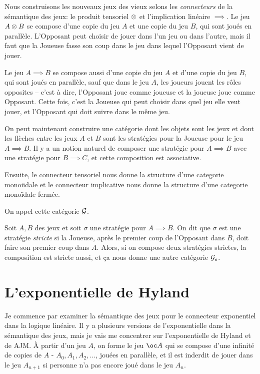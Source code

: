 \documentclass[11pt]{article}
\begin{document}
Nous construisons les nouveaux jeux des vieux selons les \emph{connecteurs} de la s\'{e}mantique des jeux: le produit tensoriel $\otimes$ et l'implication lin\'{e}aire $\implies$.  Le jeu $A\otimes B$ se compose d'une copie du jeu $A$ et une copie du jeu $B$, qui sont jou\'{e}s en parall\`{e}le.  L'Opposant peut choisir de jouer dans l'un jeu ou dans l'autre, mais il faut que la Joueuse fasse son coup dans le jeu dans lequel l'Opposant vient de jouer.  

Le jeu $A\implies B$ se compose aussi d'une copie du jeu $A$ et d'une copie du jeu $B$, qui sont jou\'{e}s en parall\`{e}le, sauf que dans le jeu $A$, les joueurs jouent les r\^{o}les opposites -- c'est \`{a} dire, l'Opposant joue comme joueuse et la joueuse joue comme Opposant.  Cette fois, c'est la Joueuse qui peut choisir dans quel jeu elle veut jouer, et l'Opposant qui doit suivre dans le m\^{e}me jeu.  

On peut maintenant construire une cat\'{e}gorie dont les objets sont les jeux et dont les fl\`{e}ches entre les jeux $A$ et $B$ sont les strat\'{e}gies pour la Joueuse pour le jeu $A\implies B$.  Il y a un notion naturel de composer une strat\'{e}gie pour $A\implies B$ avec une strat\'{e}gie pour $B\implies C$, et cette composition est associative.  

Ensuite, le connecteur tensoriel nous donne la structure d'une categorie monoi\"{i}dale et le connecteur implicative nous donne la structure d'une categorie mono\"{i}dale ferm\'{e}e.

On appel cette cat\'{e}gorie $\mathcal G$.  

Soit $A,B$ des jeux et soit $\sigma$ une strat\'{e}gie pour $A\implies B$.  On dit que $\sigma$ est une strat\'{e}gie \emph{stricte} si la Joueuse, apr\`{e}s le premier coup de l'Opposant dans $B$, doit faire son premier coup dans $A$.  Alors, si on compose deux strat\'{e}gies strictes, la composition est stricte aussi, et \c{c}a nous donne une autre cat\'{e}gorie $\mathcal G_s$.  

\section{L'exponentielle de Hyland}

Je commence par examiner la s\'{e}mantique des jeux pour le connecteur exponentiel dans la logique lin\'{e}aire.  Il y a plusieurs versions de l'exponentielle dans la s\'{e}mantique des jeux, mais je vais me concentrer sur l'exponentielle de Hyland et de AJM.  \`{A} partir d'un jeu $A$, on forme le jeu $\oc A$ qui se compose d'une infinit\'{e} de copies de $A$ - $A_0, A_1, A_2, \dots$, jou\'{e}es en parall\`{e}le, et il est inderdit de jouer dans le jeu $A_{n+1}$ si personne n'a pas encore jou\'{e} dans le jeu $A_n$.  
\end{document}
